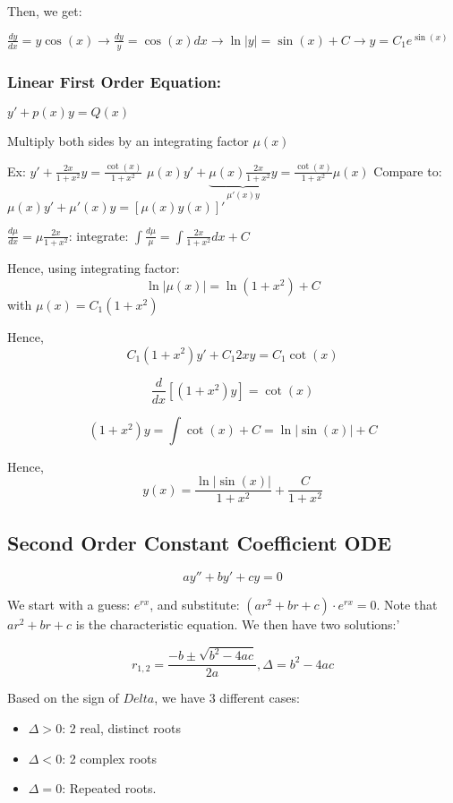 Then, we get:

$\frac{dy}{dx} = y \cos(x) \rightarrow \frac{dy}{y} = \cos(x) dx \longrightarrow \ln{|y|} = \sin(x) + C \rightarrow y = C_1 e^{\sin(x)}$

\subsubsection{Linear First Order Equation:}

$y' + p(x) y = Q(x)$

Multiply both sides by an integrating factor $\mu(x)$

Ex: $y' + \frac{2x}{1 + x^2} y = \frac{\cot(x)}{1 + x^2}$
$\mu(x) y' + \underbrace{\mu(x) \frac{2x}{1 + x^2} y}_{\mu'(x) y} = \frac{\cot(x)}{1 + x^2} \mu(x)$
Compare to: $\mu(x) y' + \mu'(x) y = \left[\mu(x) y(x) \right]'$

$\frac{d \mu}{dx} = \mu \frac{2x}{1 + x^2}$: integrate: $\int{\frac{d \mu}{\mu}} = \int{\frac{2x}{1 + x^2} dx + C}$

Hence, using integrating factor: $$ \ln |\mu(x)| = \ln(1 + x^2) + C$$ with $\mu(x) = C_1 (1 + x^2)$

Hence, $$C_1(1 + x^2) y' + C_1 2xy = C_1 \cot(x)$$

$$\frac{d}{dx} \left[ (1 + x^2) y \right] = \cot(x)$$

$$(1+x^2)y = \int \cot(x) + C = \ln|\sin(x)| + C$$

Hence, $$y(x) = \frac{\ln|\sin(x)|}{1+x^2} + \frac{C}{1+x^2}$$

\subsection{Second Order Constant Coefficient ODE}

$$ay'' + by' + cy = 0$$

We start with a guess: $e^{rx}$, and substitute: $(ar^2 + br + c) \cdot e^{rx} = 0$. Note that $ar^2 + br + c$ is the characteristic equation. We then have two solutions:'

$$r_{1,2} = \frac{-b \pm \sqrt{b^2 - 4ac}}{2a}, \Delta = b^2 - 4ac$$

Based on the sign of $Delta$, we have 3 different cases:

\begin{itemize}
    \item $\Delta > 0$: 2 real, distinct roots
    \item $\Delta < 0$: 2 complex roots
    \item $\Delta = 0$: Repeated roots. 
\end{itemize}

